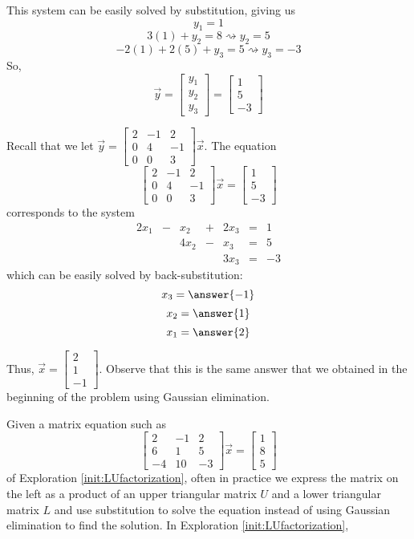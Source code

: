 \documentclass{ximera}
\begin{document}
\begin{exploration}
This system can be easily solved by substitution, giving us
$$y_1=1$$
$$3(1)+y_2=8 \rightsquigarrow y_2=5$$
$$-2(1)+2(5)+y_3=5 \rightsquigarrow y_3=-3$$
So,
$$\vec{y}=\begin{bmatrix}y_1\\y_2\\y_3\end{bmatrix}=\begin{bmatrix}1\\5\\-3\end{bmatrix}$$
     
Recall that we let $\vec{y}=\begin{bmatrix}2&-1&2\\0&4&-1\\0&0&3\end{bmatrix}\vec{x}$. 
The equation
$$\begin{bmatrix}2&-1&2\\0&4&-1\\0&0&3\end{bmatrix}\vec{x}=\begin{bmatrix}1\\5\\-3\end{bmatrix}$$
corresponds to the system
$$\begin{matrix}
     2x_1& -&x_2&+&2x_3&=&1\\
       & &4x_2&-&x_3&= &5 \\
      & &&&3x_3&=&-3
    \end{matrix}$$
    which can be easily solved by back-substitution:
    $$x_3=\answer{-1}$$
    $$x_2=\answer{1}$$
    $$x_1=\answer{2}$$
     
    Thus, $\vec{x}=\begin{bmatrix}2\\1\\-1\end{bmatrix}$.  Observe that this is the same answer that we obtained in the beginning of the problem using Gaussian elimination. 
\end{exploration}

 
Given a matrix equation such as
$$\begin{bmatrix}2&-1&2\\6&1&5\\-4&10&-3\end{bmatrix}\vec{x}=\begin{bmatrix}1\\8\\5\end{bmatrix}$$
of Exploration \ref{init:LUfactorization}, often in practice we express the matrix on the left as a product of an upper triangular matrix $U$ and a lower triangular matrix $L$ and use substitution to solve the equation instead of using Gaussian elimination to find the solution.  In Exploration \ref{init:LUfactorization},
 
\end{document}
